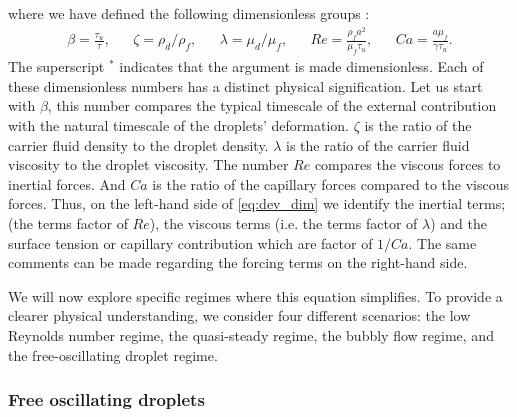 where we have defined the following dimensionless groups : 
\begin{align*}
    \beta = \frac{\tau_u}{\tau},
    && \zeta = \rho_d /\rho_f,
    && \lambda = \mu_d/\mu_f,
    && Re = \frac{\rho_f a^2 }{ \mu_f \tau_u},
    && Ca = \frac{a \mu_f}{\gamma \tau_u}. 
\end{align*}
The superscript $^*$ indicates that the argument is made dimensionless. 
Each of these dimensionless numbers has a distinct physical signification. 
Let us start with $\beta$, this number compares the typical timescale of the external contribution with the natural timescale of the droplets' deformation.
$\zeta$ is the ratio of the carrier fluid density to the droplet density. 
$\lambda$ is the ratio of the carrier fluid viscosity to the droplet viscosity. 
The number $Re$ compares the viscous forces to inertial forces. 
And $Ca$ is the ratio of the capillary forces compared to the viscous forces. 
Thus, on the left-hand side of \ref{eq:dev_dim} we identify the inertial terms; (the terms factor of $Re$), the viscous terms (i.e. the terms factor of $\lambda$) and the surface tension or capillary contribution which are factor of $1/Ca$. 
The same comments can be made regarding the forcing terms on the right-hand side. 


We will now explore specific regimes where this equation simplifies. To provide a clearer physical understanding, we consider four different scenarios: the low Reynolds number regime, the quasi-steady regime, the bubbly flow regime, and the free-oscillating droplet regime. 


\subsubsection{Free oscillating droplets}

